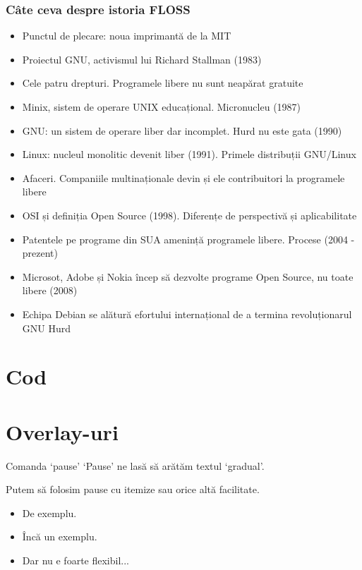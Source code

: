 \documentclass{beamer}
\begin{document}
\begin{frame}[allowframebreaks] %
\frametitle{Câte ceva despre istoria FLOSS}
\begin{itemize}
\item Punctul de plecare: noua imprimantă de la MIT
\item Proiectul GNU, activismul lui Richard Stallman (1983)
\item Cele patru drepturi. Programele libere nu sunt neapărat gratuite
\item Minix, sistem de operare UNIX educațional. Micronucleu (1987)
\item GNU: un sistem de operare liber dar incomplet. Hurd nu este gata (1990)
\item Linux: nucleul monolitic devenit liber (1991). Primele distribuții
GNU/Linux
\item Afaceri. Companiile multinaționale devin și ele contribuitori la
programele libere
\item OSI și definiția Open Source (1998). Diferențe de perspectivă și
aplicabilitate
\item Patentele pe programe din SUA amenință programele libere. Procese (2004
- prezent)
\item Microsot, Adobe și Nokia încep să dezvolte programe Open Source, nu
toate libere (2008)
\item Echipa Debian se alătură efortului internațional de a termina
revoluționarul GNU Hurd
\end{itemize}
\end{frame}

\section{Cod}
\frame{\tableofcontents[currentsection]}



\section{Overlay-uri}
\frame{\tableofcontents[currentsection]}

\begin{frame}{Comanda `pause'}
`Pause' ne lasă să arătăm textul `gradual'.

\pause Putem să folosim pause cu itemize sau orice altă facilitate.
\begin{itemize}
\pause \item De exemplu.
\pause \item Încă un exemplu.
\pause \item Dar nu e foarte flexibil...
\end{itemize}
\end{frame}
\end{document}
